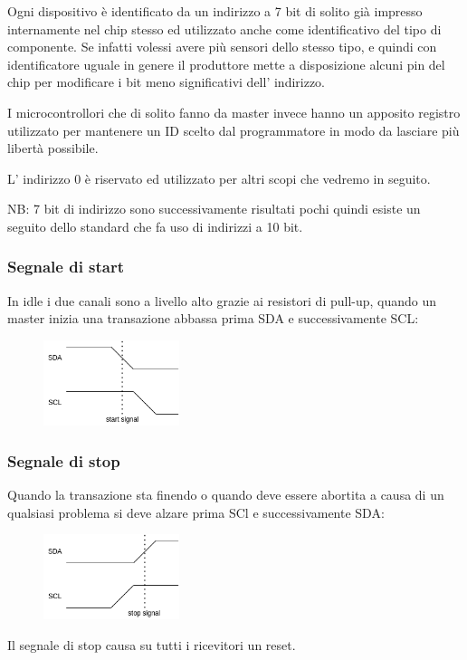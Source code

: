 Ogni dispositivo è identificato da un indirizzo a 7 bit di solito già impresso internamente nel chip stesso ed utilizzato anche come identificativo del tipo di componente.
Se infatti volessi avere più sensori dello stesso tipo, e quindi con identificatore uguale in genere il produttore mette a disposizione alcuni pin del chip per modificare i bit meno significativi dell' indirizzo.

I microcontrollori che di solito fanno da master invece hanno un apposito registro utilizzato per mantenere un ID scelto dal programmatore in modo da lasciare più libertà possibile.

L' indirizzo 0 è riservato ed utilizzato per altri scopi che vedremo in seguito.

NB: 7 bit di indirizzo sono successivamente risultati pochi quindi esiste un seguito dello standard che fa uso di indirizzi a 10 bit.

\subsubsection{Segnale di start}
In idle i due canali sono a livello alto grazie ai resistori di pull-up, quando un master inizia una transazione abbassa prima SDA e successivamente SCL:
\begin{figure}[H]
    \centering
    \includegraphics[width=150px]{images/24_I2C-TWI/i2c_start_signal.png}
\end{figure}

\subsubsection{Segnale di stop}
Quando la transazione sta finendo o quando deve essere abortita a causa di un qualsiasi problema si deve alzare prima SCl e successivamente SDA:
\begin{figure}[H]
    \centering
    \includegraphics[width=150px]{images/24_I2C-TWI/i2c_stop_signal.png}
\end{figure}
Il segnale di stop causa su tutti i ricevitori un reset.

